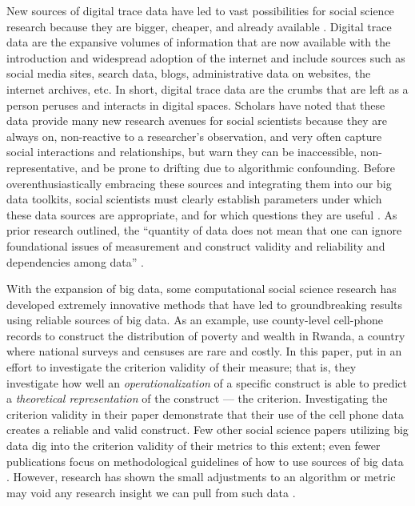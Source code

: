 New sources of digital trace data have led to vast possibilities for social
science research because they are bigger, cheaper, and already available
\citep{kingEnsuringDataRichFuture2011,lazerComputationalSocialScience2009,salganikBitBitSocial2017}.
Digital trace data are the expansive volumes of information that are now
available with the introduction and widespread adoption of the internet and
include sources such as social media sites, search data, blogs, administrative
data on websites, the internet archives, etc. In short, digital trace data are
the crumbs that are left as a person peruses and interacts in digital spaces.
Scholars have noted that these data provide many new research avenues for social
scientists because they are always on, non-reactive to a researcher's
observation, and very often capture social interactions and relationships, but
warn they can be inaccessible, non-representative, and be prone to drifting due
to algorithmic confounding\citep{salganikBitBitSocial2017}. Before
overenthusiastically embracing these sources and integrating them into our big
data toolkits, social scientists must clearly establish parameters under which
these data sources are appropriate, and for which questions they are useful
\citep{bailCulturalEnvironmentMeasuring2014, lazerParableGoogleFlu2014}. As
prior research outlined, the ``quantity of data does not mean that one can ignore
foundational issues of measurement and construct validity and reliability and
dependencies among data'' \citep[p. 1203]{lazerParableGoogleFlu2014}.

With the expansion of big data, some computational social science research has
developed extremely innovative methods that have led to groundbreaking results
using reliable sources of big data. As an
example,\citet{blumenstockPredictingPovertyWealth2015} use county-level
cell-phone records to construct the distribution of poverty and wealth in
Rwanda, a country where national surveys and censuses are rare and costly.
In this paper,  \citet{blumenstockPredictingPovertyWealth2015} put in an effort to 
investigate the criterion validity of their measure; that is, they investigate 
how well an \textit{operationalization} of a specific construct is able to 
predict a \textit{theoretical representation} of the construct — the criterion. 
Investigating the criterion validity in their paper demonstrate that their use
of the cell phone data creates a reliable and valid construct. 
Few other social science papers utilizing big data dig into the criterion
validity of their metrics to this extent; even fewer publications focus on
methodological guidelines of how to use sources of big data \citep[For
exceptions, see ][]{asseoTrackingCOVID19Using2020,
stilesAssessingCriterionValidity2018}. However, research has shown the small
adjustments to an algorithm or metric may void any research insight we can pull
from such data \citep{lazerParableGoogleFlu2014}.

